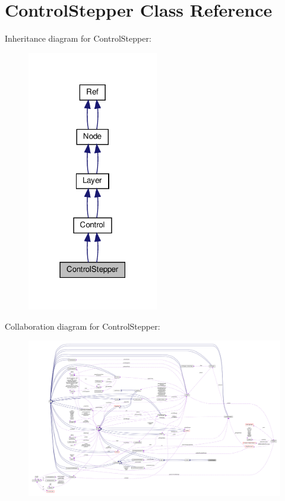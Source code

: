 \hypertarget{classControlStepper}{}\section{Control\+Stepper Class Reference}
\label{classControlStepper}


Inheritance diagram for Control\+Stepper\+:
\nopagebreak
\begin{figure}[H]
\begin{center}
\leavevmode
\includegraphics[width=162pt]{classControlStepper__inherit__graph}
\end{center}
\end{figure}


Collaboration diagram for Control\+Stepper\+:
\nopagebreak
\begin{figure}[H]
\begin{center}
\leavevmode
\includegraphics[width=350pt]{classControlStepper__coll__graph}
\end{center}
\end{figure}
